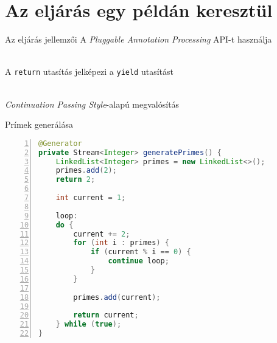 \section{Az eljárás egy példán keresztül}

\begin{frame}{Az eljárás jellemzői}
A \textit{Pluggable Annotation Processing} API-t használja


\hfill \\

\pause
A \texttt{return} utasítás jelképezi a \texttt{yield} utasítást


\hfill \\

\pause
\textit{Continuation Passing Style}-alapú megvalósítás
\end{frame}


\begin{frame}[fragile]{Prímek generálása}
\begin{center}
\begin{lstlisting}[language=java, xleftmargin=15pt,
        basicstyle=\fontsize{7}{9}\selectfont,
        numbers=left,
        numbersep=5pt, escapechar=!,
        linebackgroundcolor={
            \btLstHL<1>{30} % No highlighting
            \btLstHL<2>{5}
            \btLstHL<3>{20}
        }]
@Generator
private Stream<Integer> generatePrimes() {
    LinkedList<Integer> primes = new LinkedList<>();
    primes.add(2);
    return 2;

    int current = 1;

    loop:
    do {
        current += 2;
        for (int i : primes) {
            if (current % i == 0) {
                continue loop;
            }
        }

        primes.add(current);

        return current;
    } while (true);
}
\end{lstlisting}
\end{center}
\par
\end{frame}


